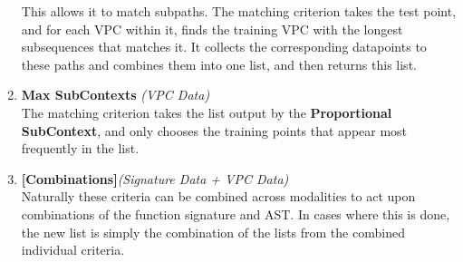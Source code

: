 \begin{enumerate}
    This allows it to match subpaths. The matching criterion takes the test point, and for each VPC within it, finds the training VPC with the longest subsequences that matches it. It collects the corresponding datapoints to these paths and combines them into one list, and then returns this list.
    \item\textbf{Max SubContexts} \textit{(VPC Data)}\\The matching criterion takes the list output by the \textbf{Proportional SubContext}, and only chooses the training points that appear most frequently in the list. 
    \item\textbf{[Combinations]}\textit{(Signature Data + VPC Data)} \\ Naturally these criteria can be combined across modalities to act upon combinations of the function signature and AST. In cases where this is done, the new list is simply the combination of the lists from the combined individual criteria. 
\end{enumerate}









